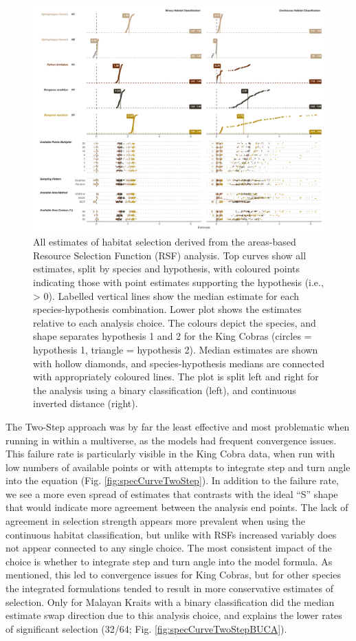 \documentclass[10pt,a4paper]{article}
\begin{document}
\begin{figure}
\includegraphics[width=1\linewidth]{../../figures/specCurve_rsf} \caption{All estimates of habitat selection derived from the areas-based Resource Selection Function (RSF) analysis. Top curves show all estimates, split by species and hypothesis, with coloured points indicating those with point estimates supporting the hypothesis (i.e., > 0). Labelled vertical lines show the median estimate for each species-hypothesis combination. Lower plot shows the estimates relative to each analysis choice. The colours depict the species, and shape separates hypothesis 1 and 2 for the King Cobras (circles = hypothesis 1, triangle = hypothesis 2). Median estimates are shown with hollow diamonds, and species-hypothesis medians are connected with appropriately coloured lines. The plot is split left and right for the analysis using a binary classification (left), and continuous inverted distance (right).}\label{fig:specCurveRsf}
\end{figure}

The Two-Step approach was by far the least effective and most problematic when running in within a multiverse, as the models had frequent convergence issues.
This failure rate is particularly visible in the King Cobra data, when run with low numbers of available points or with attempts to integrate step and turn angle into the equation (Fig. \ref{fig:specCurveTwoStep}).
In addition to the failure rate, we see a more even spread of estimates that contrasts with the ideal ``S'' shape that would indicate more agreement between the analysis end points.
The lack of agreement in selection strength appears more prevalent when using the continuous habitat classification, but unlike with RSFs increased variably does not appear connected to any single choice.
The most consistent impact of the choice is whether to integrate step and turn angle into the model formula.
As mentioned, this led to convergence issues for King Cobras, but for other species the integrated formulations tended to result in more conservative estimates of selection.
Only for Malayan Kraits with a binary classification did the median estimate swap direction due to this analysis choice, and explains the lower rates of significant selection (32/64; Fig. \ref{fig:specCurveTwoStepBUCA}).
\end{document}
